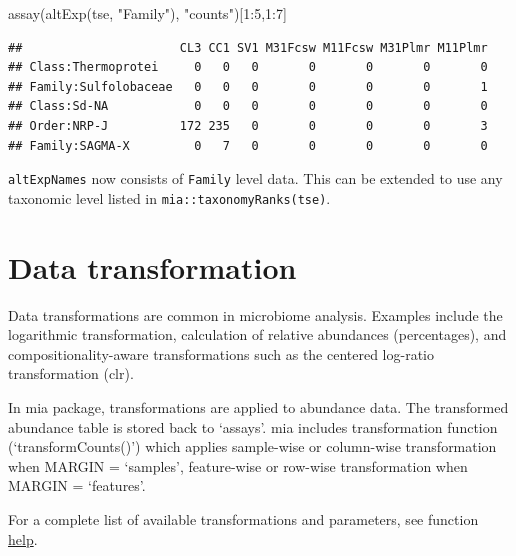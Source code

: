 \documentclass[
]{book}
\newenvironment{Shaded}{\begin{snugshade}}{\end{snugshade}}
\newcommand{\DecValTok}[1]{\textcolor[rgb]{0.00,0.00,0.81}{#1}}
\newcommand{\FunctionTok}[1]{\textcolor[rgb]{0.00,0.00,0.00}{#1}}
\newcommand{\NormalTok}[1]{#1}
\newcommand{\SpecialCharTok}[1]{\textcolor[rgb]{0.00,0.00,0.00}{#1}}
\newcommand{\StringTok}[1]{\textcolor[rgb]{0.31,0.60,0.02}{#1}}
\begin{document}
\begin{Shaded}
\begin{Highlighting}[]
\FunctionTok{assay}\NormalTok{(}\FunctionTok{altExp}\NormalTok{(tse, }\StringTok{"Family"}\NormalTok{), }\StringTok{"counts"}\NormalTok{)[}\DecValTok{1}\SpecialCharTok{:}\DecValTok{5}\NormalTok{,}\DecValTok{1}\SpecialCharTok{:}\DecValTok{7}\NormalTok{]}
\end{Highlighting}
\end{Shaded}

\begin{verbatim}
##                      CL3 CC1 SV1 M31Fcsw M11Fcsw M31Plmr M11Plmr
## Class:Thermoprotei     0   0   0       0       0       0       0
## Family:Sulfolobaceae   0   0   0       0       0       0       1
## Class:Sd-NA            0   0   0       0       0       0       0
## Order:NRP-J          172 235   0       0       0       0       3
## Family:SAGMA-X         0   7   0       0       0       0       0
\end{verbatim}

\texttt{altExpNames} now consists of \texttt{Family} level data. This can be extended to use
any taxonomic level listed in \texttt{mia::taxonomyRanks(tse)}.

\hypertarget{data-transformation}{%
\section{Data transformation}\label{data-transformation}}

Data transformations are common in microbiome analysis. Examples
include the logarithmic transformation, calculation of relative
abundances (percentages), and compositionality-aware transformations
such as the centered log-ratio transformation (clr).

In mia package, transformations are applied to abundance data. The transformed
abundance table is stored back to `assays'. mia includes transformation
function (`transformCounts()') which applies sample-wise or column-wise transformation when MARGIN = `samples', feature-wise or row-wise transformation when MARGIN = `features'.

For a complete list of available transformations and parameters, see function
\href{https://microbiome.github.io/mia/reference/transformCounts.html}{help}.
\end{document}
